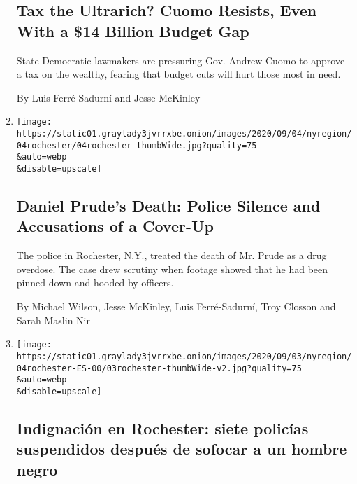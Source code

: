 \begin{enumerate}
  \hypertarget{tax-the-ultrarich-cuomo-resists-even-with-a-14-billion-budget-gap}{%
  \subsection{Tax the Ultrarich? Cuomo Resists, Even With a \$14 Billion
  Budget
  Gap}\label{tax-the-ultrarich-cuomo-resists-even-with-a-14-billion-budget-gap}}

  State Democratic lawmakers are pressuring Gov. Andrew Cuomo to approve
  a tax on the wealthy, fearing that budget cuts will hurt those most in
  need.

  By Luis Ferré-Sadurní and Jesse McKinley
\item
  \href{/2020/09/04/nyregion/rochester-police-daniel-prude.html}{}

  \texttt{[image: https://static01.graylady3jvrrxbe.onion/images/2020/09/04/nyregion/04rochester/04rochester-thumbWide.jpg?quality=75\\\&auto=webp\\\&disable=upscale]}

  \hypertarget{daniel-prudes-death-police-silence-and-accusations-of-a-cover-up}{%
  \subsection{Daniel Prude's Death: Police Silence and Accusations of a
  Cover-Up}\label{daniel-prudes-death-police-silence-and-accusations-of-a-cover-up}}

  The police in Rochester, N.Y., treated the death of Mr. Prude as a
  drug overdose. The case drew scrutiny when footage showed that he had
  been pinned down and hooded by officers.

  By Michael Wilson, Jesse McKinley, Luis Ferré-Sadurní, Troy Closson
  and Sarah Maslin Nir
\item
  \href{/es/2020/09/04/espanol/estados-unidos/daniel-prude-rochester-policia.html}{}

  \texttt{[image: https://static01.graylady3jvrrxbe.onion/images/2020/09/03/nyregion/04rochester-ES-00/03rochester-thumbWide-v2.jpg?quality=75\\\&auto=webp\\\&disable=upscale]}

  \hypertarget{indignaciuxf3n-en-rochester-siete-policuxedas-suspendidos-despuuxe9s-de-sofocar-a-un-hombre-negro}{%
  \subsection{Indignación en Rochester: siete policías suspendidos
  después de sofocar a un hombre
  negro}\label{indignaciuxf3n-en-rochester-siete-policuxedas-suspendidos-despuuxe9s-de-sofocar-a-un-hombre-negro}}


\end{enumerate}
